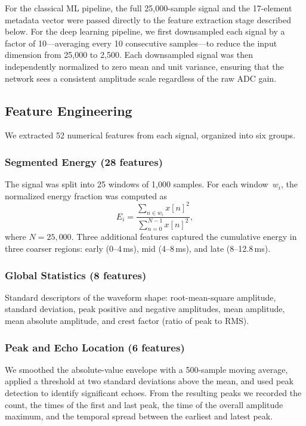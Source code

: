 \documentclass[conference,a4paper]{IEEEtran}
\begin{document}
For the classical ML pipeline, the full 25{,}000-sample signal and the 17-element metadata vector were passed directly to the feature extraction stage described below. For the deep learning pipeline, we first downsampled each signal by a factor of 10---averaging every 10 consecutive samples---to reduce the input dimension from 25{,}000 to 2{,}500. Each downsampled signal was then independently normalized to zero mean and unit variance, ensuring that the network sees a consistent amplitude scale regardless of the raw ADC gain.

\subsection{Feature Engineering}

We extracted 52 numerical features from each signal, organized into six groups.

\subsubsection{Segmented Energy (28 features)}
The signal was split into 25 windows of 1{,}000 samples. For each window~$w_i$, the normalized energy fraction was computed as
\begin{equation}
    E_i = \frac{\sum_{n \in w_i} x[n]^2}{\sum_{n=0}^{N-1} x[n]^2},
    \label{eq:seg_energy}
\end{equation}
where $N = 25{,}000$. Three additional features captured the cumulative energy in three coarser regions: early (0--4\,ms), mid (4--8\,ms), and late (8--12.8\,ms).

\subsubsection{Global Statistics (8 features)}
Standard descriptors of the waveform shape: root-mean-square amplitude, standard deviation, peak positive and negative amplitudes, mean amplitude, mean absolute amplitude, and crest factor (ratio of peak to RMS).

\subsubsection{Peak and Echo Location (6 features)}
We smoothed the absolute-value envelope with a 500-sample moving average, applied a threshold at two standard deviations above the mean, and used peak detection to identify significant echoes. From the resulting peaks we recorded the count, the times of the first and last peak, the time of the overall amplitude maximum, and the temporal spread between the earliest and latest peak.
\end{document}
